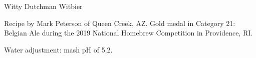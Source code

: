 \begin{recipe}{Witty Dutchman Witbier}

\begin{aboutblock}
Recipe by Mark Peterson of Queen Creek, AZ. Gold medal in Category 21: Belgian
Ale during the 2019 National Homebrew Competition in Providence, RI. \sourceaha
\end{aboutblock}


\begin{methodandtiming}
 
\begin{mashsteps}
\end{mashsteps}

\begin{fermentationsteps}
\end{fermentationsteps}

\begin{directions}
Water adjustment: mash pH of 5.2.
\end{directions}

\end{methodandtiming}

\recipebreak

\begin{ingredientsblock}

\begin{malts}
\end{malts}

\begin{hops}
\end{hops}


\end{ingredientsblock}

\end{recipe}
